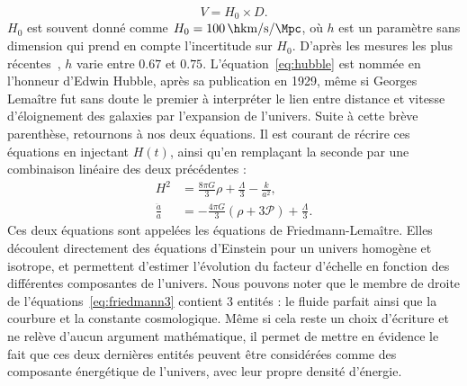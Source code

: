 \documentclass[11pt, twoside, a4paper, openright]{report}
\begin{document}
\begin{equation}
  \label{eq:hubble}
  V = H_0 \times D.
\end{equation}
$H_0$ est souvent donné comme $H_{0} = \SI{100}{\h\km\per\s\per\Mpc}$, où $h$ est un paramètre sans dimension qui prend en compte l'incertitude sur $H_0$. D'après les mesures les plus récentes~\cite{CITE planck + Riess ?}, $h$ varie entre $\num{0,67}$ et $\num{0,75}$.
L'équation~\ref{eq:hubble} est nommée en l'honneur d'Edwin Hubble, après sa publication en 1929, même si Georges Lemaître fut sans doute le premier à interpréter le lien entre distance et vitesse d'éloignement des galaxies par l'expansion de l'univers.
Suite à cette brève parenthèse, retournons à nos deux équations. Il est courant de récrire ces équations en injectant $H(t)$, ainsi qu'en remplaçant la seconde par une combinaison linéaire des deux précédentes :
\begin{align}
  \label{eq:friedmann3}
  H^2 &= \frac{8 \pi G}{3} \rho + \frac{\Lambda}{3} - \frac{k}{a^2} ,\\
  \label{eq:friedmann4}
  \frac{\ddot{a}}{a} &= - \frac{4 \pi G}{3} (\rho + 3 \mathcal{P}) + \frac{\Lambda}{3} .
\end{align}
Ces deux équations sont appelées les équations de Friedmann-Lemaître. Elles découlent directement des équations d'Einstein pour un univers homogène et isotrope,
et permettent d'estimer l'évolution du facteur d'échelle en fonction des différentes composantes de l'univers.
Nous pouvons noter que le membre de droite de l'équations~\ref{eq:friedmann3} contient 3 entités : le fluide parfait ainsi que la courbure et la constante cosmologique. Même si cela reste un choix d'écriture et ne relève d'aucun argument mathématique, il permet de mettre en évidence le fait que ces deux dernières entités peuvent être considérées comme des composante énergétique de l'univers, avec leur propre densité d'énergie.
\end{document}

